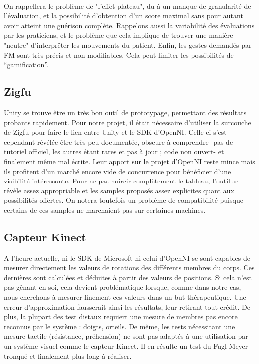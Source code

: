 \documentclass[french,12pt]{report}
\begin{document}
\paragraph{}
On rappellera le problème de "l'effet plateau", du à un manque de granularité de l'évaluation, et la possibilité
d'obtention d'un score maximal sans pour autant avoir atteint une guérison complète. Rappelons aussi la variabilité
des évaluations par les praticiens, et le problème que cela implique de trouver une manière "neutre" d'interprêter
les mouvements du patient.
Enfin, les gestes demandés par FM sont très précis et non modifiables. Cela peut limiter les possibilités de “gamification”.
		
			\subsection{Zigfu}
Unity se trouve être un très bon outil de prototypage, permettant des résultats probants rapidement. Pour notre projet, il était nécessaire d'utiliser la surcouche de Zigfu pour faire le lien entre Unity et le SDK d'OpenNI. Celle-ci s'est cependant révélée être très peu documentée, obscure à comprendre -pas de tutoriel officiel, les autres étant rares et pas à jour ; code non ouvert- et finalement même mal écrite. Leur apport sur le projet d'OpenNI reste mince mais ils profitent d'un marché encore vide de concurrence pour bénéficier d'une visibilité intéressante. Pour ne pas noircir complètement le tableau, l'outil se révèle assez appropriable et les samples proposés assez explicites quant aux possibilités offertes. On notera toutefois un problème de compatibilité puisque certains de ces samples ne marchaient pas sur certaines machines.
		
		\subsection{Capteur Kinect}
A l'heure actuelle, ni le SDK de Microsoft ni celui d'OpenNI se sont capables de mesurer directement les valeurs de rotations des 
différents membres du corps. Ces dernières sont calculées et déduites à partir des valeurs de positions. Si cela n'est pas gênant en soi, cela devient problématique lorsque, comme dans notre cas, nous cherchons à mesurer finement ces valeurs dans un but thérapeutique. Une erreur d'approximation fausserait ainsi les résultats, leur retirant tout crédit.
De plus, la plupart des test distaux requiert une mesure de membres pas encore reconnus par le système : doigts, orteils.
De même, les tests nécessitant une mesure tactile (résistance, préhension) ne sont pas adaptés à une utilisation par un système visuel comme le capteur Kinect. Il en résulte un test du Fugl Meyer tronqué et finalement plus long à réaliser.
\end{document}
